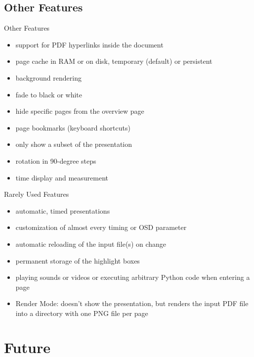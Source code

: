 \documentclass[bigger,hyperref={colorlinks=true,linkcolor=white,urlcolor=blue}]{beamer}
\begin{document}
\subsection{Other Features}
\begin{frame}{Other Features}
    \begin{itemize}
        \item support for PDF hyperlinks inside the document
        \item page cache in RAM or on disk, temporary (default) or persistent
        \item background rendering
        \item fade to black or white
        \item hide specific pages from the overview page
        \item page bookmarks (keyboard shortcuts)
        \item only show a subset of the presentation
        \item rotation in 90-degree steps
        \item time display and measurement
    \end{itemize}
\end{frame}
\begin{frame}{Rarely Used Features}
    \begin{itemize}
        \item automatic, timed presentations
        \item customization of almost every timing or OSD parameter
        \item automatic reloading of the input file(s) on change
        \item permanent storage of the highlight boxes
        \item playing sounds or videos or executing arbitrary Python code
              when entering a page
        \item {\glqq}Render Mode{\grqq}: doesn't show the presentation, but
              renders the input PDF file into a directory with one PNG file
              per page
    \end{itemize}
\end{frame}


\section{Future}
\end{document}
